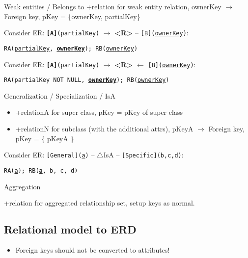 \begin{theorem}
    {Weak entities / Belongs to}
    +relation for weak entity relation, ownerKey $\to$ Foreign key, pKey = \{ownerKey, partialKey\}

    \tcblower

    Consider ER: \texttt{\textbf{[A]}(partialKey)} $\rightarrow$ \textbf{<R>} -- \texttt{[B](\underline{ownerKey})}:

    \texttt{RA(\underline{partialKey}, \underline{\textbf{ownerKey}}); RB(\underline{ownerKey})}

    Consider ER: \texttt{\textbf{[A]}(partialKey)} $\rightarrow$ \textbf{<R>} $\leftarrow$ \texttt{[B](\underline{ownerKey})}:

    \texttt{RA(partialKey NOT NULL, \underline{\textbf{ownerKey}}); RB(\underline{ownerKey})}
\end{theorem}

\begin{theorem}
    {Generalization / Specialization / IsA}

    \begin{itemize}
        \item +relationA for super class, pKey = pKey of super class
        \item +relationN for subclass (with the additional attrs), pKeyA $\to$ Foreign key, pKey = \{ pKeyA \}
    \end{itemize}

    \tcblower

    Consider ER: \texttt{[General](\underline{a})} -- $\triangle$IsA -- \texttt{[Specific](b,c,d)}:

    \texttt{RA(\underline{a}); RB(\underline{\textbf{a}}, b, c, d)}
\end{theorem}

\begin{theorem}
    {Aggregation}

    +relation for aggregated relationship set, setup keys as normal.
\end{theorem}

\subsection{Relational model to ERD}

\begin{itemize}
    \item Foreign keys should not be converted to attributes!
\end{itemize}





